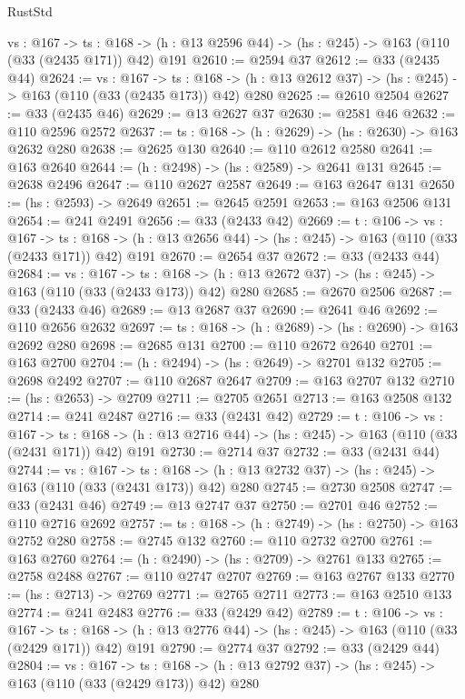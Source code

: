 \begin{lexlean}{RustStd}
\begin{coremodule}
  {vs : @167} ->
  {ts : @168} -> (h : @13 @2596 @44) -> (hs : @245) -> @163 (@110 (@33 (@2435 @171)) @42) @191
@2610 := @2594 @37
@2612 := @33 (@2435 @44)
@2624 := {vs : @167} ->
  {ts : @168} -> (h : @13 @2612 @37) -> (hs : @245) -> @163 (@110 (@33 (@2435 @173)) @42) @280
@2625 := @2610 @2504
@2627 := @33 (@2435 @46)
@2629 := @13 @2627 @37
@2630 := @2581 @46
@2632 := @110 @2596 @2572
@2637 := {ts : @168} -> (h : @2629) -> (hs : @2630) -> @163 @2632 @280
@2638 := @2625 @130
@2640 := @110 @2612 @2580
@2641 := @163 @2640
@2644 := (h : @2498) -> (hs : @2589) -> @2641 @131
@2645 := @2638 @2496
@2647 := @110 @2627 @2587
@2649 := @163 @2647 @131
@2650 := (hs : @2593) -> @2649
@2651 := @2645 @2591
@2653 := @163 @2506 @131
@2654 := @241 @2491
@2656 := @33 (@2433 @42)
@2669 := {t : @106} ->
  {vs : @167} ->
  {ts : @168} -> (h : @13 @2656 @44) -> (hs : @245) -> @163 (@110 (@33 (@2433 @171)) @42) @191
@2670 := @2654 @37
@2672 := @33 (@2433 @44)
@2684 := {vs : @167} ->
  {ts : @168} -> (h : @13 @2672 @37) -> (hs : @245) -> @163 (@110 (@33 (@2433 @173)) @42) @280
@2685 := @2670 @2506
@2687 := @33 (@2433 @46)
@2689 := @13 @2687 @37
@2690 := @2641 @46
@2692 := @110 @2656 @2632
@2697 := {ts : @168} -> (h : @2689) -> (hs : @2690) -> @163 @2692 @280
@2698 := @2685 @131
@2700 := @110 @2672 @2640
@2701 := @163 @2700
@2704 := (h : @2494) -> (hs : @2649) -> @2701 @132
@2705 := @2698 @2492
@2707 := @110 @2687 @2647
@2709 := @163 @2707 @132
@2710 := (hs : @2653) -> @2709
@2711 := @2705 @2651
@2713 := @163 @2508 @132
@2714 := @241 @2487
@2716 := @33 (@2431 @42)
@2729 := {t : @106} ->
  {vs : @167} ->
  {ts : @168} -> (h : @13 @2716 @44) -> (hs : @245) -> @163 (@110 (@33 (@2431 @171)) @42) @191
@2730 := @2714 @37
@2732 := @33 (@2431 @44)
@2744 := {vs : @167} ->
  {ts : @168} -> (h : @13 @2732 @37) -> (hs : @245) -> @163 (@110 (@33 (@2431 @173)) @42) @280
@2745 := @2730 @2508
@2747 := @33 (@2431 @46)
@2749 := @13 @2747 @37
@2750 := @2701 @46
@2752 := @110 @2716 @2692
@2757 := {ts : @168} -> (h : @2749) -> (hs : @2750) -> @163 @2752 @280
@2758 := @2745 @132
@2760 := @110 @2732 @2700
@2761 := @163 @2760
@2764 := (h : @2490) -> (hs : @2709) -> @2761 @133
@2765 := @2758 @2488
@2767 := @110 @2747 @2707
@2769 := @163 @2767 @133
@2770 := (hs : @2713) -> @2769
@2771 := @2765 @2711
@2773 := @163 @2510 @133
@2774 := @241 @2483
@2776 := @33 (@2429 @42)
@2789 := {t : @106} ->
  {vs : @167} ->
  {ts : @168} -> (h : @13 @2776 @44) -> (hs : @245) -> @163 (@110 (@33 (@2429 @171)) @42) @191
@2790 := @2774 @37
@2792 := @33 (@2429 @44)
@2804 := {vs : @167} ->
  {ts : @168} -> (h : @13 @2792 @37) -> (hs : @245) -> @163 (@110 (@33 (@2429 @173)) @42) @280

\end{coremodule}
\end{lexlean}
